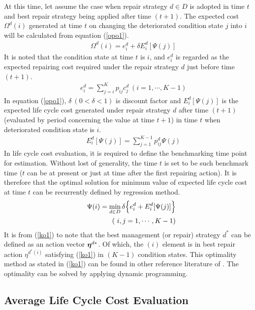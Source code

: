 At this time, let assume the case when repair strategy $d \in D$ is adopted in time $t$ and best repair strategy being applied after time $(t+1)$. The expected cost $\Omega^{d}(i)$ generated at time $t$ on changing the deteriorated condition state $j$ into $i$ will be calculated from equation (\ref{opo1}).
\begin{eqnarray}
&& \Omega^{d}(i)=e_i^d+\delta E_{i}^{d}[\Psi(j)] \label{opo1}
\end{eqnarray}
It is noted that the condition state at time $t$ is $i$, and $e_i^d$ is regarded as the expected repairing cost required under the repair strategy $d$ just before time $(t+1)$.
\begin{eqnarray}
&& e_i^d=\sum_{j=i}^{K} p_{ij}c_j^d~(i=1,\cdots,K-1)
\end{eqnarray}
In equation (\ref{opo1}), $\delta~(0< \delta <1)$ is discount factor and $E_{i}^{d}[\Psi(j)]$ is the expected life cycle cost generated under repair strategy $d$ after time $(t+1)$ (evaluated by period concerning the value at time $t+1$) in time $t$ when deteriorated condition state is $i$.
\begin{eqnarray}
&& E_{i}^{d} [\Psi(j)]=\sum_{j=1}^{K-1} p^{d}_{ij} \Psi(j) \nonumber
\label{oo6}
\end{eqnarray}
In life cycle cost evaluation, it is required to define the benchmarking time point for estimation. Without lost of generality, the time $t$ is set to be such benchmark time ($t$ can be at present or just at time after the first repairing action). It is therefore that the optimal solution for minimum value of expected life cycle cost at time $t$ can be recurrently defined by regression method.
\begin{eqnarray}
&& \Psi(i)= \min_{d \in D} \delta\Big\{e_i^{d} +  E_{i}^{d}[\Psi(j)]\Big\} \label{ko1} \\
&& \hspace{10mm} (~i,j=1,\cdots,K-1) \nonumber
\end{eqnarray}
It is from (\ref{ko1}) to note that the best management (or repair) strategy $d^{\ast}$ can be defined as an action vector $\mbox{\boldmath$\eta$}^{d\ast}$. Of which, the $(i)$ element is in best repair action $\eta^{d^\ast(i)}$ satisfying (\ref{ko1}) in $(K-1)$ condition states. This optimality method as stated in (\ref{ko1}) can be found in other reference literature of \citet{Durango02}. The optimality can be solved by applying dynamic programming.
\subsection{Average Life Cycle Cost Evaluation}
\label{633}
